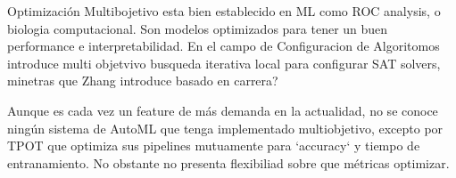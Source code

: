 
Optimizaci\'on Multibojetivo esta bien establecido en ML como ROC analysis, o biologia computacional. Son modelos optimizados para tener un buen performance e interpretabilidad.
En el campo de Configuracion de Algoritomos introduce multi objetvivo busqueda iterativa local para configurar SAT solvers, minetras que Zhang introduce basado en carrera?

Aunque es cada vez un feature de m\'as demanda en la actualidad, no se conoce ning\'un sistema de AutoML que tenga implementado multiobjetivo, excepto por TPOT que optimiza sus pipelines mutuamente para `accuracy` y tiempo de entranamiento. No obstante no presenta flexibiliad sobre que m\'etricas optimizar.


